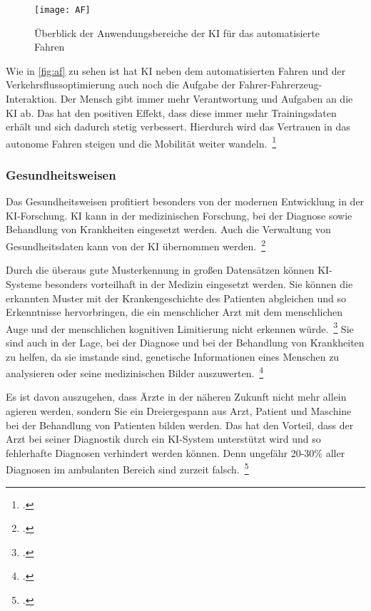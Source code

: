 \begin{figure}[H]
    \centering
    \texttt{[image: AF]} 
    \caption[Überblick der Anwendungsbereiche der KI für das automatisierte \mbox{Fahren}]{Überblick der Anwendungsbereiche der KI für das automatisierte \mbox{Fahren}\footnotemark}
    \label{fig:af}
\end{figure}

Wie in \autoref{fig:af} zu sehen ist hat \ac{KI} neben dem automatisierten Fahren und der Verkehrsflussoptimierung auch noch die Aufgabe der Fahrer-Fahrerzeug-Interaktion. Der Mensch 
gibt immer mehr Verantwortung und Aufgaben an die \ac{KI} ab. Das hat den positiven Effekt, dass diese immer mehr Trainingsdaten erhält und sich dadurch stetig verbessert.
Hierdurch wird das Vertrauen in das autonome Fahren steigen und die Mobilität weiter wandeln.~\footcite[\vglf][]{Wittpahl.2018}

\subsubsection{Gesundheitsweisen}

Das Gesundheitsweisen profitiert besonders von der modernen Entwicklung in der \ac{KI}-Forschung. \ac{KI} kann in der medizinischen Forschung, bei der Diagnose sowie Behandlung 
von Krankheiten eingesetzt werden. Auch die Verwaltung von Gesundheitsdaten kann von der \ac{KI} übernommen werden.~\footcite[\vglf][]{Robot.2023}

Durch die überaus gute Musterkennung in großen Datensätzen können \ac{KI}-Systeme besonders vorteilhaft in der Medizin eingesetzt werden. Sie können die erkannten Muster mit
der Krankengeschichte des Patienten abgleichen und so Erkenntnisse hervorbringen, die ein menschlicher Arzt mit dem menschlichen Auge und der menschlichen kognitiven Limitierung nicht 
erkennen würde.~\footcite[\vglf][]{Buchkremer.2020} Sie sind auch in der Lage, bei der Diagnose und bei der Behandlung von Krankheiten zu helfen, 
da sie imstande sind, genetische Informationen eines Menschen zu analysieren oder seine medizinischen Bilder auszuwerten.~\footcite[\vglf][]{Robot.2023}

Es ist davon auszugehen, dass Ärzte in der näheren Zukunft nicht mehr allein agieren werden, sondern Sie ein Dreiergespann aus Arzt, Patient und Maschine bei der Behandlung von Patienten bilden werden. 
Das hat den Vorteil, dass der Arzt bei seiner Diagnostik durch ein \ac{KI}-System unterstützt wird und so fehlerhafte Diagnosen verhindert werden können. Denn ungefähr 
20-30\% aller Diagnosen im ambulanten Bereich sind zurzeit falsch.~\footcite[\vglf][]{Buchkremer.2020}

